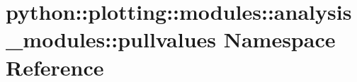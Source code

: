 \hypertarget{namespacepython_1_1plotting_1_1modules_1_1analysis__modules_1_1pullvalues}{
\section{python::plotting::modules::analysis\_\-modules::pullvalues Namespace Reference}
\label{namespacepython_1_1plotting_1_1modules_1_1analysis__modules_1_1pullvalues}
}
